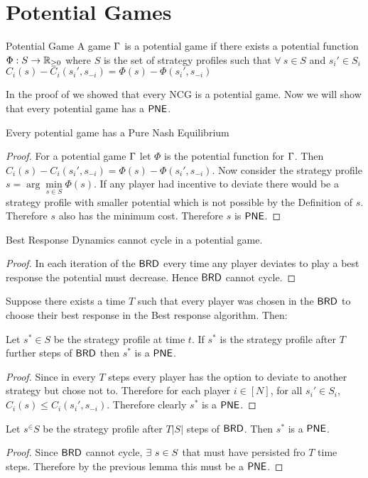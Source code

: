 \section{Potential Games}
\begin{Definition}{Potential Game}{}
	A game $\Gamma$ is a potential game if there exists a potential function $\Phi:S\to\mathbb{R}_{\geq 0}$ where $S$ is the set of strategy profiles such that $\forall\ s\in S$ and $s_i'\in S_i$ $C_i(s)-C_i(s_i',s_{-i})=\Phi(s)-\Phi(s_i',s_{-i})$
\end{Definition}
 
 In the proof of  we showed that every NCG is a potential game. Now we will show that every potential game has a $\operatorname{\mathsf{PNE}}$.
 \begin{Theorem}{}{}
 	Every potential game has a Pure Nash Equilibrium
 \end{Theorem}
\begin{proof}
	For a potential game $\Gamma$ let $\Phi$ is the potential function for $\Gamma$. Then $C_i(s)-C_i(s_i',s_{-i})=\Phi(s)-\Phi(s_i',s_{-i})$. Now consider the strategy profile $s=\arg\min\limits_{s\in S}\Phi(s)$. If any player had incentive to deviate there would be a strategy profile with smaller potential which is not possible by the Definition of $s$. Therefore $s$ also has the minimum cost. Therefore $s$ is $\operatorname{\mathsf{PNE}}$. 
\end{proof}

\begin{lemma}{}{}
	Best Response Dynamics cannot cycle in a potential game.
\end{lemma}
\begin{proof}
	In each iteration of the $\operatorname{\mathsf{BRD}}$ every time any player deviates to play a best response the potential must decrease. Hence $\operatorname{\mathsf{BRD}}$ cannot cycle.
\end{proof}

Suppose there exists a time $T$ such that every player was chosen in the $\operatorname{\mathsf{BRD}}$ to choose their best response in the Best response algorithm. Then:
\begin{lemma}{}{}
	Let $s^*\in S$ be the strategy profile at time $t$. If $s^*$ is the strategy profile after $T$ further steps of $\operatorname{\mathsf{BRD}}$ then $s^*$ is a $\operatorname{\mathsf{PNE}}$.
\end{lemma}
\begin{proof}
	Since in every $T$ steps every player has the option to deviate to another strategy but chose not to. Therefore for each player $i\in[N]$, for all $s_i'\in S_i$, $C_i(s)\leq C_i(s_i',s_{-i})$. Therefore clearly $s^*$ is a $\operatorname{\mathsf{PNE}}$. 
\end{proof}
\begin{lemma}{}{}
	Let $s^\in S$ be the strategy profile after $T|S|$ steps of $\operatorname{\mathsf{BRD}}$. Then $s^*$ is a $\operatorname{\mathsf{PNE}}$.
\end{lemma}
\begin{proof}
	Since $\operatorname{\mathsf{BRD}}$ cannot cycle, $\exists\ s\in S$ that must have persisted fro $T$ time steps. Therefore by the previous lemma this must be a $\operatorname{\mathsf{PNE}}$.
\end{proof}

